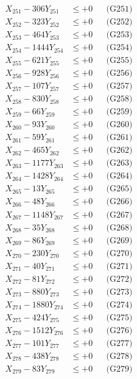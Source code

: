 \documentclass[a4paper,10pt]{article}
\begin{document}
{\begin{align}
\allowbreak
X_{251} - 306Y_{251} &\leq +0 && \text{(G251)} \\
X_{252} - 323Y_{252} &\leq +0 && \text{(G252)} \\
X_{253} - 464Y_{253} &\leq +0 && \text{(G253)} \\
X_{254} - 1444Y_{254} &\leq +0 && \text{(G254)} \\
X_{255} - 621Y_{255} &\leq +0 && \text{(G255)} \\
X_{256} - 928Y_{256} &\leq +0 && \text{(G256)} \\
X_{257} - 107Y_{257} &\leq +0 && \text{(G257)} \\
X_{258} - 830Y_{258} &\leq +0 && \text{(G258)} \\
X_{259} - 66Y_{259} &\leq +0 && \text{(G259)} \\
X_{260} - 93Y_{260} &\leq +0 && \text{(G260)} \\
\allowbreak
X_{261} - 59Y_{261} &\leq +0 && \text{(G261)} \\
X_{262} - 465Y_{262} &\leq +0 && \text{(G262)} \\
X_{263} - 1177Y_{263} &\leq +0 && \text{(G263)} \\
X_{264} - 1428Y_{264} &\leq +0 && \text{(G264)} \\
X_{265} - 13Y_{265} &\leq +0 && \text{(G265)} \\
X_{266} - 48Y_{266} &\leq +0 && \text{(G266)} \\
X_{267} - 1148Y_{267} &\leq +0 && \text{(G267)} \\
X_{268} - 35Y_{268} &\leq +0 && \text{(G268)} \\
X_{269} - 86Y_{269} &\leq +0 && \text{(G269)} \\
X_{270} - 230Y_{270} &\leq +0 && \text{(G270)} \\
\allowbreak
X_{271} - 40Y_{271} &\leq +0 && \text{(G271)} \\
X_{272} - 81Y_{272} &\leq +0 && \text{(G272)} \\
X_{273} - 880Y_{273} &\leq +0 && \text{(G273)} \\
X_{274} - 1880Y_{274} &\leq +0 && \text{(G274)} \\
X_{275} - 424Y_{275} &\leq +0 && \text{(G275)} \\
X_{276} - 1512Y_{276} &\leq +0 && \text{(G276)} \\
X_{277} - 101Y_{277} &\leq +0 && \text{(G277)} \\
X_{278} - 438Y_{278} &\leq +0 && \text{(G278)} \\
X_{279} - 83Y_{279} &\leq +0 && \text{(G279)} \\

\end{align}}
\end{document}
